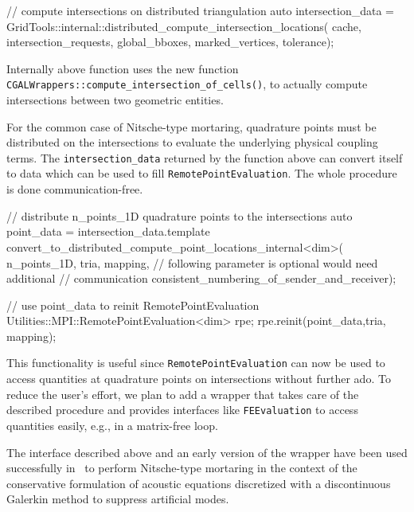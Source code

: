 \documentclass{ansarticle-preprint}
\begin{document}
\begin{c++}
// compute intersections on distributed triangulation  
auto intersection_data =
       GridTools::internal::distributed_compute_intersection_locations(
         cache, intersection_requests, global_bboxes, marked_vertices,
         tolerance);
\end{c++}


Internally above function uses the new function \texttt{CGALWrappers::compute\_intersection\_of\_cells()}, to actually compute intersections between two geometric entities.

For the common case of Nitsche-type mortaring, quadrature points must be distributed on the intersections to evaluate the underlying physical coupling terms.
The \texttt{intersection\_data} returned by the function above can convert itself to data which can be used to fill \texttt{RemotePointEvaluation}.
The whole procedure is done communication-free.
\begin{c++}
// distribute n_points_1D quadrature points to the intersections
auto point_data = intersection_data.template 
       convert_to_distributed_compute_point_locations_internal<dim>(
         n_points_1D, tria, mapping,
         // following parameter is optional would need additional
         // communication 
         consistent_numbering_of_sender_and_receiver);

// use point_data to reinit RemotePointEvaluation
Utilities::MPI::RemotePointEvaluation<dim> rpe;
rpe.reinit(point_data,tria, mapping);
\end{c++}

This functionality is useful since \texttt{RemotePointEvaluation} can now be used to access quantities at quadrature points on intersections without further ado.
To reduce the user's effort, we plan to add a wrapper that takes care of the described procedure and provides interfaces like \texttt{FEEvaluation} to access quantities easily, e.g., in a matrix-free loop.

The interface described above and an early version of the wrapper have
been used successfully in~\cite{heinz2023high} to perform Nitsche-type
mortaring in the context of the conservative formulation of acoustic
equations discretized with a discontinuous Galerkin method to suppress
artificial modes.
\end{document}
